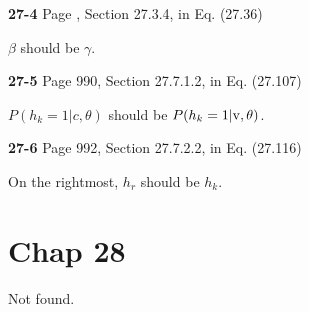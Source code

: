 \documentclass[aps,preprint,a4]{revtex4-1}
\begin{document}
{\color{red}\textbf{27-4}} Page , Section 27.3.4, in Eq. (27.36)

$\beta$ should be $\gamma$.

{\color{red}\textbf{27-5}} Page 990, Section 27.7.1.2, in Eq. (27.107)

$P(h_{k}=1|c,\theta)$ should be $P(h_{k}=1|\rm v,\theta)$.

{\color{red}\textbf{27-6}} Page 992, Section 27.7.2.2, in Eq. (27.116)

On the rightmost, $h_{r}$ should be $h_{k}$.

\section{Chap 28}
Not found.

\end{document}
